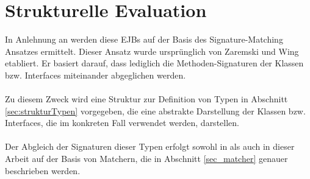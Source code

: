 \section{Strukturelle Evaluation}
In Anlehnung an \cite{hummel08} werden diese EJBs auf der Basis des Signature-Matching Ansatzes ermittelt. Dieser Ansatz wurde ursprünglich von Zaremski und Wing \cite{moormann} etabliert. Er basiert darauf, dass lediglich die Methoden-Signaturen der Klassen bzw. Interfaces miteinander abgeglichen werden. 
\\\\
Zu diesem Zweck wird eine Struktur zur Definition von Typen in Abschnitt \ref{sec:strukturTypen} vorgegeben, die eine abstrakte Darstellung der Klassen bzw. Interfaces, die im konkreten Fall verwendet werden, darstellen.
\\\\
Der Abgleich der Signaturen dieser Typen erfolgt sowohl in \cite{moormann} als auch in dieser Arbeit auf der Basis von Matchern, die in Abschnitt \ref{sec_matcher} genauer beschrieben werden.
